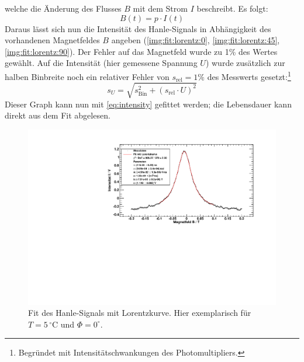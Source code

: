 welche die Änderung des Flusses $B$ mit dem Strom $I$ beschreibt. 
Es folgt:
\begin{equation}
  B(t) = p \cdot I(t)
\end{equation}
Daraus lässt sich nun die Intensität des Hanle-Signals in Abhängigkeit des vorhandenen Magnetfeldes $B$ angeben (\autoref{img:fit:lorentz:0}, 
\autoref{img:fit:lorentz:45}, \autoref{img:fit:lorentz:90}).
Der Fehler auf das Magnetfeld wurde zu 1\% des Wertes gewählt. Auf die Intensität (hier gemessene Spannung $U$) wurde zusätzlich zur halben Binbreite 
noch ein relativer Fehler von $s_\text{rel} = 1\%$ des Messwerts gesetzt:\footnote{Begründet mit Intensitätschwankungen des Photomultipliers.}
\begin{equation}
  s_U = \sqrt{s_{\text{Bin}}^2 + (s_\text{rel} \cdot U)^2}
\end{equation}
Dieser Graph kann nun mit \autoref{eq:intensity} gefittet werden; die Lebensdauer kann direkt aus dem Fit abgelesen.
\begin{figure}[H]
\begin{center}
  \includegraphics[width=\textwidth]{../img/fit_00_p05_1.pdf}
  \caption{Fit des Hanle-Signals mit Lorentzkurve. Hier exemplarisch für $T=5\,{}^\circ$C und $\Phi=0^\circ$.}
  \label{img:fit:lorentz:0}
\end{center}
\end{figure}
